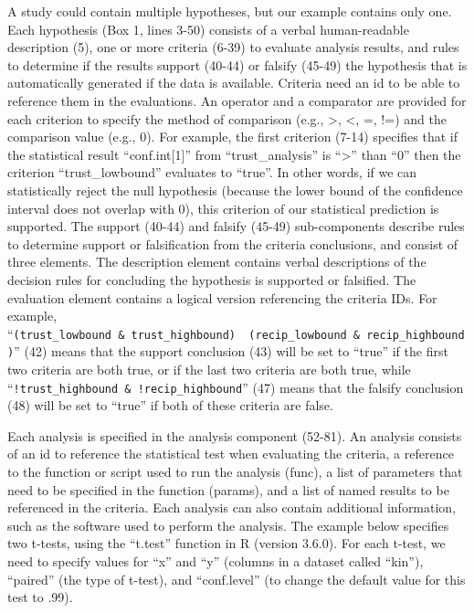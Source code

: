 \documentclass[doc,floatsintext]{apa6}
\begin{document}
A study could contain multiple hypotheses, but our example contains only one. Each hypothesis (Box 1, lines 3-50) consists of a verbal human-readable description (5), one or more criteria (6-39) to evaluate analysis results, and rules to determine if the results support (40-44) or falsify (45-49) the hypothesis that is automatically generated if the data is available. Criteria need an id to be able to reference them in the evaluations. An operator and a comparator are provided for each criterion to specify the method of comparison (e.g., \textgreater{}, \textless{}, =, !=) and the comparison value (e.g., 0). For example, the first criterion (7-14) specifies that if the statistical result ``conf.int{[}1{]}'' from ``trust\_analysis'' is ``\textgreater{}'' than ``0'' then the criterion ``trust\_lowbound'' evaluates to ``true''. In other words, if we can statistically reject the null hypothesis (because the lower bound of the confidence interval does not overlap with 0), this criterion of our statistical prediction is supported.
The support (40-44) and falsify (45-49) sub-components describe rules to determine support or falsification from the criteria conclusions, and consist of three elements. The description element contains verbal descriptions of the decision rules for concluding the hypothesis is supported or falsified. The evaluation element contains a logical version referencing the criteria IDs. For example, ``\texttt{(trust\_lowbound\ \&\ trust\_highbound)\ \textbar{}\ (recip\_lowbound\ \&\ recip\_highbound)}'' (42) means that the support conclusion (43) will be set to ``true'' if the first two criteria are both true, or if the last two criteria are both true, while ``\texttt{!trust\_highbound\ \&\ !recip\_highbound}'' (47) means that the falsify conclusion (48) will be set to ``true'' if both of these criteria are false.

Each analysis is specified in the analysis component (52-81). An analysis consists of an id to reference the statistical test when evaluating the criteria, a reference to the function or script used to run the analysis (func), a list of parameters that need to be specified in the function (params), and a list of named results to be referenced in the criteria. Each analysis can also contain additional information, such as the software used to perform the analysis. The example below specifies two t-tests, using the ``t.test'' function in R (version 3.6.0). For each t-test, we need to specify values for ``x'' and ``y'' (columns in a dataset called ``kin''), ``paired'' (the type of t-test), and ``conf.level'' (to change the default value for this test to .99).
\end{document}

